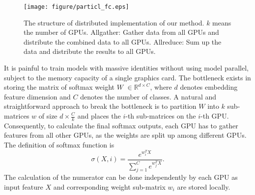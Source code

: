 \documentclass[letterpaper]{article} \usepackage{style/aaai21}  \usepackage{times}  \usepackage{helvet} \usepackage{courier}  \usepackage[hyphens]{url}  \usepackage{graphicx} \usepackage{color}
\begin{document}
\begin{figure*}[t]
	\centering
	\texttt{[image: figure/particl\_fc.eps]} \caption{The structure of  distributed implementation of our method. $k$  means the number of GPUs. Allgather: Gather data from all GPUs and distribute the combined data to all GPUs. Allreduce: Sum up the data and distribute the results to all GPUs.}
	\label{fig2}
\end{figure*}
It is painful to train models with massive identities without using model parallel, subject to the memory capacity of a single graphics card. The bottleneck exists in storing the matrix of softmax weight $W$ $\in \mathbb{R}^{d\times C}$, where $d$ denotes embedding feature dimension and $C$ denotes the number of classes. A natural and straightforward approach to break the bottleneck is to partition $W$ into $k$ sub-matrices $w$ of size $d \times \frac{C}{k} $  and places the $i$-th sub-matrices on the $i$-th GPU. Consequently, to calculate the final softmax outputs, each GPU has to gather features from all other GPUs, as the weights are split up among different GPUs. The definition of softmax function is \begin{equation}
\sigma(X, i) = \frac{e^{w_{i}^TX}}{\sum\nolimits_{j=1}^{C}e^{w_{j}^TX}}.\label{softmax}
\end{equation}
The calculation of the numerator can be done independently by each GPU as input feature $X$ and corresponding weight sub-matrix $w_{i}$ are stored locally.
\end{document}
